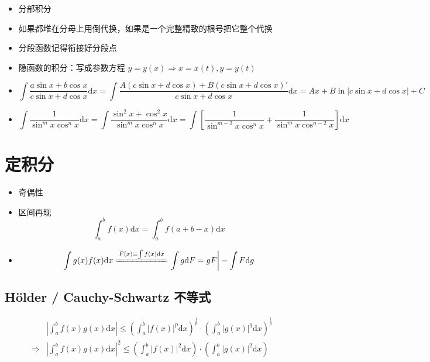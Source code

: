 \documentclass{ctexart}
\begin{document}
\begin{itemize}
    \item 分部积分
    \item 如果都堆在分母上用倒代换，如果是一个完整精致的根号把它整个代换
    \item 分段函数记得衔接好分段点
    \item 隐函数的积分：写成参数方程 $y = y(x) \Rightarrow x = x(t), y = y(t)$
    \item \begin{equation}
              \int \frac{a \sin x + b \cos x}{c \sin x + d \cos x} \mathrm{d}x = \int \frac{A (c \sin x + d \cos x) + B (c \sin x + d \cos x)'}{c \sin x + d \cos x} \mathrm{d}x = A x + B \ln |c \sin x + d \cos x| + C
          \end{equation}
    \item \begin{equation}
              \int \frac{1}{\sin^m x \cos^n x} \mathrm{d}x = \int \frac{\sin^2x + \cos^2 x}{\sin^m x \cos^n x} \mathrm{d}x = \int \left[\frac{1}{\sin^{m-2} x \cos^n x} + \frac{1}{\sin^m x \cos^{n-2} x}\right] \mathrm{d}x
          \end{equation}
\end{itemize}

\section{定积分}

\begin{itemize}
    \item 奇偶性
    \item 区间再现 \begin{equation}
              \int_a^b f(x) \mathrm{d}x = \int_a^b f(a + b - x) \mathrm{d}x
          \end{equation}
    \item \begin{equation}
              \int g(x) f(x) \mathrm{d}x \xlongequal{F(x) \equiv \int f(x) \mathrm{d}x} \left.\int g \mathrm{d}F = g F\right| - \int F \mathrm{d}g
          \end{equation}
\end{itemize}

\subsection{H\"{o}lder / Cauchy-Schwartz 不等式}

\begin{align}
                & \left| \int_a^b f(x) g(x) \mathrm{d} x \right| \leq \left( \int_a^b |f(x)|^p \mathrm{d} x \right)^{\frac{1}{p}} \cdot \left( \int_a^b |g(x)|^q \mathrm{d} x \right)^{\frac{1}{q}} \\
    \Rightarrow & \left| \int_a^b f(x) g(x) \mathrm{d} x \right|^2 \leq \left( \int_a^b |f(x)|^2 \mathrm{d} x \right) \cdot \left( \int_a^b |g(x)|^2 \mathrm{d} x \right)
\end{align}
\end{document}
